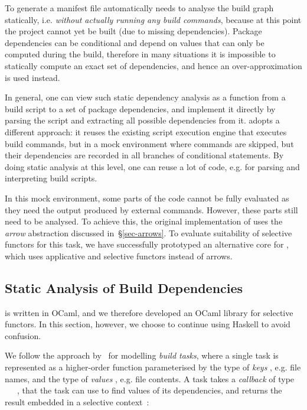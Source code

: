 

To generate a manifest file automatically \Dune needs to analyse the build graph
statically, i.e. \emph{without actually running any build commands}, because at
this point the project cannot yet be built (due to missing dependencies).
Package dependencies can be conditional and depend on values that can only be
computed during the build, therefore in many situations it is impossible to
statically compute an exact set of dependencies, and hence an over-approximation
is used instead.

In general, one can view such static dependency analysis as a function from a
build script to a set of package dependencies, and implement it directly by
parsing the script and extracting all possible dependencies from it. \Dune
adopts a different approach: it reuses the existing script execution engine that
executes build commands, but in a mock environment where commands are skipped,
but their dependencies are recorded in all branches of conditional statements.
By doing static analysis at this level, one can reuse a lot of code, e.g. for
parsing and interpreting build scripts.

In this mock environment, some parts of the code cannot be fully evaluated as
they need the output produced by external commands. However, these parts still
need to be analysed. To achieve this, the original implementation of \Dune uses
the \emph{arrow} abstraction discussed in~\S\ref{sec-arrows}. To evaluate
suitability of selective functors for this task, we have successfully prototyped
an alternative core for \Dune, which uses applicative and selective functors
instead of arrows.

\subsection{Static Analysis of Build Dependencies}\label{sec-static-example}

\Dune is written in OCaml, and we therefore developed an OCaml library for
selective functors. In this section, however, we choose to continue using
Haskell to avoid confusion.

We follow the approach by~\citet{mokhov2018build} for modelling \emph{build
tasks}, where a single task is represented as a higher-order function
parameterised by the type of \emph{keys} , e.g. file names, and the type
of \emph{values} , e.g. file contents. A task takes a \emph{callback} of
type ~\hs{->}~~, that the task can use to find values of its
dependencies, and returns the result embedded in a selective context~:

